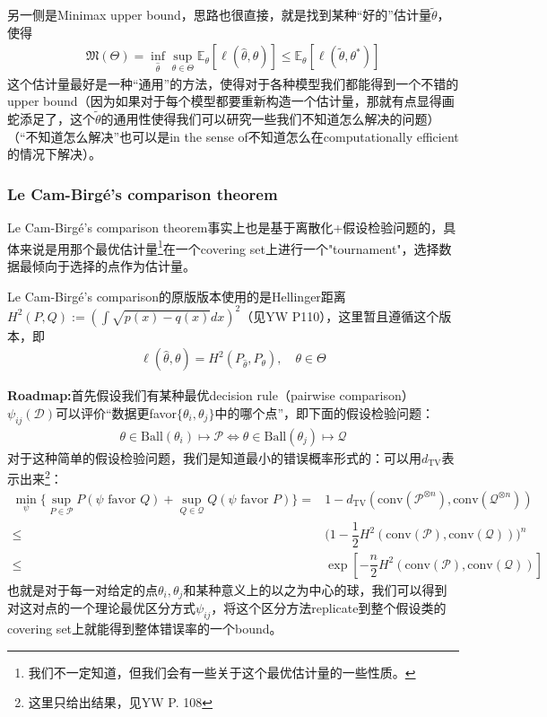 \documentclass[11pt,a4paper]{ctexart}
\numberwithin{equation}{section}%
\begin{document}
另一侧是Minimax upper bound，思路也很直接，就是找到某种“好的”估计量$ \tilde{\theta } $，使得
\begin{align*}
    \mathfrak{M}(\Theta) = \mathop{ \inf  }\limits_{\hat{\theta }} \mathop{ \sup  }\limits_{\theta \in \Theta} \mathbb{E}_\theta\left[ \ell(\hat{\theta},\theta) \right] \leq \mathbb{E}_\theta\left[ \ell(\tilde{\theta } ,\theta ^* ) \right]
\end{align*}
这个估计量最好是一种“通用”的方法，使得对于各种模型我们都能得到一个不错的upper bound（因为如果对于每个模型都要重新构造一个估计量，那就有点显得画蛇添足了，这个$ \tilde{\theta } $的通用性使得我们可以研究一些我们不知道怎么解决的问题）（“不知道怎么解决”也可以是in the sense of不知道怎么在computationally efficient的情况下解决）。


\subsubsection{Le Cam-Birg\'e's comparison theorem}


Le Cam-Birg\'e's comparison theorem事实上也是基于离散化+假设检验问题的，具体来说是用那个最优估计量\footnote{我们不一定知道，但我们会有一些关于这个最优估计量的一些性质。}在一个covering set上进行一个"tournament"，选择数据最倾向于选择的点作为估计量。

Le Cam-Birg\'e's comparison的原版版本使用的是Hellinger距离$ H^2(P,Q):= \left( \int \sqrt{p(x)-q(x)}dx \right)^2 $（见YW P110），这里暂且遵循这个版本，即
\begin{align*}
    \ell(\hat{\theta },\theta ) = H^2(P_{\hat{\theta }},P_\theta ),\quad \theta \in \Theta
\end{align*}



\textbf{Roadmap:}首先假设我们有某种最优decision rule（pairwise comparison）$ \psi_{ij}(\mathcal{D} ) $可以评价“数据更favor$ \{\theta _i,\theta _j\} $中的哪个点”，即下面的假设检验问题：
\begin{align*}
    \theta \in \mathrm{Ball}(\theta _i) \mapsto \mathcal{P}\Leftrightarrow \theta \in \mathrm{Ball}(\theta _j) \mapsto \mathcal{Q}
\end{align*}
对于这种简单的假设检验问题，我们是知道最小的错误概率形式的：可以用$ d_{\mathrm{ TV } } $表示出来\footnote{这里只给出结果，见YW P. 108}：
\begin{align}\label{eq:LeCamBirgePairwise}
     \min_{\psi}\big\{ \sup_{P\in\mathcal{P}} P(\psi\text{ favor }Q) +  \sup_{Q\in\mathcal{Q}} Q(\psi\text{ favor }P) \big\} =& 1-d_{\mathrm{ TV } }(\mathrm{ conv }(\mathcal{P}^{\otimes n}),\mathrm{ conv }(\mathcal{Q}^{\otimes n})) \\
     \leq &\big( 1-\dfrac{ 1 }{ 2 } H^2(\mathrm{ conv }(\mathcal{P}), \mathrm{ conv }(\mathcal{Q}))  \big)^n \\\leq& \exp\left[ -\dfrac{ n }{ 2 } H^2(\mathrm{ conv }(\mathcal{P}), \mathrm{ conv }(\mathcal{Q})) \right] 
\end{align}
也就是对于每一对给定的点$ \theta _i,\theta _j $和某种意义上的以之为中心的球，我们可以得到对这对点的一个理论最优区分方式$ \psi_{ij} $，将这个区分方法replicate到整个假设类的covering set上就能得到整体错误率的一个bound。
\end{document}
